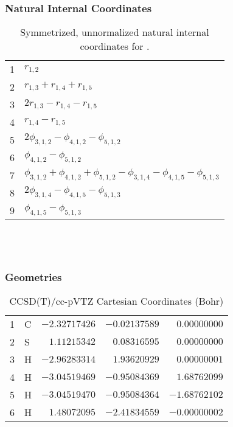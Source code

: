 \documentclass[10pt,oneside]{article}
\begin{document}
\subsubsection*{Natural Internal Coordinates}
\begin{table}[h!]
\centering
\caption{Symmetrized, unnormalized natural internal coordinates for .}
\small
\begin{tabular}{ll}
  1   & $r_{1,2}$ \\
  2   & $r_{1,3} + r_{1,4} + r_{1,5}$ \\
  3   & $2r_{1,3} - r_{1,4} - r_{1,5}$ \\
  4   & $r_{1,4} - r_{1,5}$ \\
  5   & $2\phi_{3,1,2} - \phi_{4,1,2} - \phi_{5,1,2}$ \\
  6   & $\phi_{4,1,2} - \phi_{5,1,2}$ \\
  7   & $\phi_{3,1,2} + \phi_{4,1,2} + \phi_{5,1,2} - \phi_{3,1,4} - \phi_{4,1,5} - \phi_{5,1,3}$ \\
  8   & $2\phi_{3,1,4} - \phi_{4,1,5} - \phi_{5,1,3}$ \\
  9   & $\phi_{4,1,5} - \phi_{5,1,3}$ \\
\end{tabular}
\end{table}

\clearpage

\subsection{\ \ \ }

\subsubsection*{Geometries}
\begin{table}[h!]
\centering
\caption{CCSD(T)/cc-pVTZ Cartesian Coordinates (Bohr)}
\begin{tabular}{llrrr}
1  & C  & $-2.32717426$ & $-0.02137589$ & $ 0.00000000$ \\
2  & S  & $ 1.11215342$ & $ 0.08316595$ & $ 0.00000000$ \\
3  & H  & $-2.96283314$ & $ 1.93620929$ & $ 0.00000001$ \\
4  & H  & $-3.04519469$ & $-0.95084369$ & $ 1.68762099$ \\
5  & H  & $-3.04519470$ & $-0.95084364$ & $-1.68762102$ \\
6  & H  & $ 1.48072095$ & $-2.41834559$ & $-0.00000002$ \\
\end{tabular}
\end{table}
\end{document}
